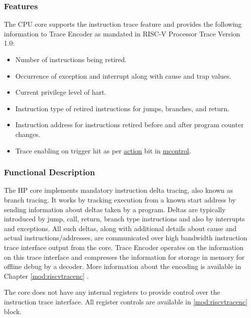 \documentclass[main\_\_EN.tex]{subfiles}
\begin{document}
\subsubsection{Features}
\label{sec:riscvcpu-trace-features}

The CPU core supports the instruction trace feature and provides the following information to Trace Encoder as mandated in RISC-V Processor Trace Version 1.0:

\begin{itemize}
    \item Number of instructions being retired.
    \item Occurrence of exception and interrupt along with cause and trap values.
    \item Current privilege level of hart.
    \item Instruction type of retired instructions for jumps, branches, and return.
    \item Instruction address for instructions retired before and after program counter changes.
    \item Trace enabling on trigger hit as per \hyperref[regdesc:MCONTROL]{action} bit in \hyperref[regdesc:MCONTROL]{mcontrol}.
\end{itemize}


\subsubsection{Functional Description}
\label{sec:riscvcpu-trace-func-descr}

The HP core implements mandatory instruction delta tracing, also known as branch tracing. It works by tracking execution from a known start address by sending information about deltas taken by a program. Deltas are typically introduced by jump, call, return, branch type instructions and also by interrupts and exceptions. All such deltas, along with additional details about cause and actual instructions/addresses, are communicated over high bandwidth instruction trace interface output from the core. Trace Encoder operates on the information on this trace interface and compresses the information for storage in memory for offline debug by a decoder. More information about the encoding is available in Chapter \ref{mod:riscvtracenc} \textit{}.

The core does not have any internal registers to provide control over the instruction trace interface. All register controls are available in \ref{mod:riscvtracenc} \textit{} block.
\end{document}
